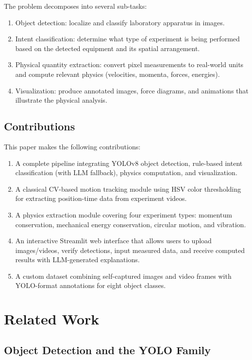 \documentclass[12pt]{article}
\begin{document}
The problem decomposes into several sub-tasks:
\begin{enumerate}[noitemsep]
  \item Object detection: localize and classify laboratory apparatus in images.
  \item Intent classification: determine what type of experiment is being performed based on the detected equipment and its spatial arrangement.
  \item Physical quantity extraction: convert pixel measurements to real-world units and compute relevant physics (velocities, momenta, forces, energies).
  \item Visualization: produce annotated images, force diagrams, and animations that illustrate the physical analysis.
\end{enumerate}

\subsection{Contributions}

This paper makes the following contributions:
\begin{enumerate}[noitemsep]
  \item A complete pipeline integrating YOLOv8 object detection, rule-based intent classification (with LLM fallback), physics computation, and visualization.
  \item A classical CV-based motion tracking module using HSV color thresholding for extracting position-time data from experiment videos.
  \item A physics extraction module covering four experiment types: momentum conservation, mechanical energy conservation, circular motion, and vibration.
  \item An interactive Streamlit web interface that allows users to upload images/videos, verify detections, input measured data, and receive computed results with LLM-generated explanations.
  \item A custom dataset combining self-captured images and video frames with YOLO-format annotations for eight object classes.
\end{enumerate}

\section{Related Work}

\subsection{Object Detection and the YOLO Family}
\end{document}
